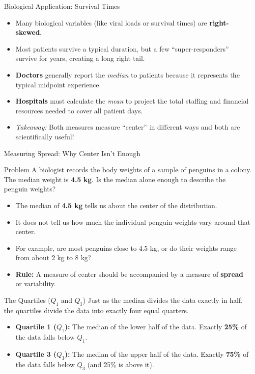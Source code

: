 \documentclass[aspectratio=169]{beamer}
\begin{document}
\begin{frame}{Biological Application: Survival Times}
\begin{itemize}
	\item Many biological variables (like viral loads or survival times) are \textbf{right-skewed}. 
	\item Most patients survive a typical duration, but a few ``super-responders'' survive for years, creating a long right tail.
	\item \textbf{Doctors} generally report the \emph{median} to patients because it represents the typical midpoint experience.
	\item \textbf{Hospitals} must calculate the \emph{mean} to project the total staffing and financial resources needed to cover all patient days.
	\item \emph{Takeaway:} Both measures measure ``center'' in different ways and both are scientifically useful!
\end{itemize}
\end{frame}


\begin{frame}{Measuring Spread: Why Center Isn't Enough}
\begin{block}{Problem}
A biologist records the body weights of a sample of penguins in a colony. The median weight is \textbf{4.5 kg}. Is the median alone enough to describe the penguin weights?
\end{block}
\pause
\begin{itemize}
	\item The median of \textbf{4.5 kg} tells us about the center of the distribution.
	\item It does not tell us how much the individual penguin weights vary around that center.
	\item For example, are most penguins close to 4.5 kg, or do their weights range from about 2 kg to 8 kg?
	\item \textbf{Rule:} A measure of center should be accompanied by a measure of \textbf{spread} or variability.
\end{itemize}
\end{frame}

\begin{frame}{The Quartiles ($Q_1$ and $Q_3$)}
Just as the median divides the data exactly in half, the quartiles divide the data into exactly four equal quarters.
\vspace{0.3cm}
\begin{itemize}
	\item \textbf{Quartile 1 ($Q_1$):} The median of the lower half of the data. Exactly \textbf{25\%} of the data falls below $Q_1$.
	\item \textbf{Quartile 3 ($Q_3$):} The median of the upper half of the data. Exactly \textbf{75\%} of the data falls below $Q_3$ (and 25\% is above it).
\end{itemize}
\end{frame}
\end{document}
